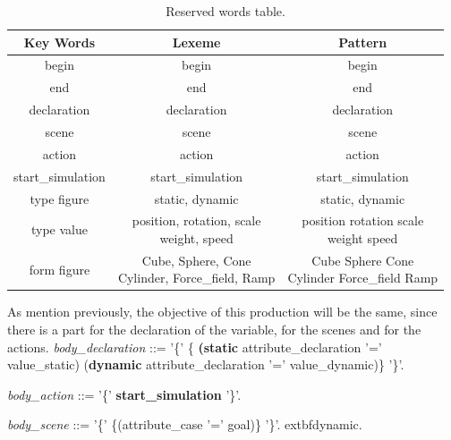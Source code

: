 \documentclass[12pt]{article}
\begin{document}
\begin{table}
	\centering
	\begin{tabular}{| c | c | c |} \hline
		\textbf{Key Words}          & \textbf{Lexeme} 													&  \textbf{Pattern} 		\\\hline
		begin            			& begin     														& begin        				\\\hline
		end             			& end      															& end        			    \\\hline
		declaration           		& declaration       												& declaration        		\\\hline
		scene           			& scene       														& scene       			  	\\\hline
		action           			& action       														& action       			  	\\\hline
		start\_simulation 			& start\_simulation       											& start\_simulation        	\\\hline
		type figure       			& static, dynamic       											& static, dynamic        	\\\hline
		type value        			& \makecell{position, rotation, scale \\ weight, speed}				& \makecell{position \textbar rotation \textbar scale \\\textbar weight \textbar speed}        \\\hline
		form figure       			& \makecell{Cube, Sphere, Cone \\ Cylinder, Force\_field, Ramp}     & \makecell{Cube \textbar Sphere \textbar Cone \\ Cylinder \textbar Force\_field \textbar Ramp}        														  \\\hline
	\end{tabular}
	\caption{\label{tab:KeyWords}Reserved words table.}
\end{table}

As mention previously, the objective of this production will be the same, since there is a part for the declaration of the variable, for the scenes and for the actions.
\noindent\textit{body\_declaration} ::= '\{' \{ \textbf{(static} attribute\_declaration '=' value\_static) \textbar (\textbf{dynamic} attribute\_declaration '=' value\_dynamic)\}  '\}'.

\noindent \textit{body\_action} ::= '\{' \textbf{start\_simulation} '\}'.

\noindent \textit{body\_scene} ::= '\{' \{(attribute\_case '=' goal)\} '\}'.
extbf{dynamic}.
\end{document}
